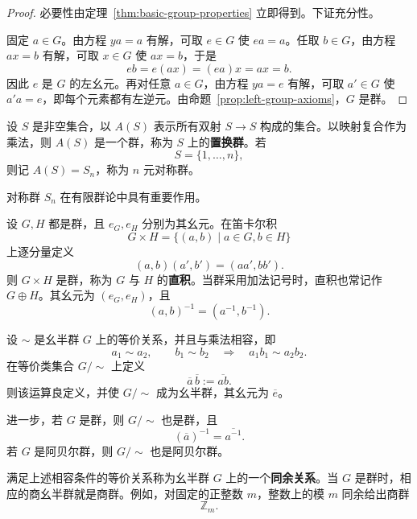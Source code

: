 \begin{proof}
必要性由定理~\ref{thm:basic-group-properties} 立即得到。下证充分性。

固定 $a\in G$。由方程 $ya=a$ 有解，可取 $e\in G$ 使 $ea=a$。任取 $b\in G$，由方程 $ax=b$ 有解，可取 $x\in G$ 使 $ax=b$，于是
\[
  eb=e(ax)=(ea)x=ax=b.
\]
因此 $e$ 是 $G$ 的左幺元。再对任意 $a\in G$，由方程 $ya=e$ 有解，可取 $a'\in G$ 使 $a'a=e$，即每个元素都有左逆元。由命题~\ref{prop:left-group-axioms}，$G$ 是群。
\end{proof}

\begin{example}[置换群]\label{ex:permutation-group}
设 $S$ 是非空集合，以 $A(S)$ 表示所有双射 $S\to S$ 构成的集合。以映射复合作为乘法，则 $A(S)$ 是一个群，称为 $S$ 上的\textbf{置换群}。若
\[
  S=\{1,\ldots,n\},
\]
则记 $A(S)=S_n$，称为 $n$ 元对称群。
\end{example}

\begin{purplenote}
对称群 $S_n$ 在有限群论中具有重要作用。
\end{purplenote}

\begin{definition}[群的直积]\label{def:group-direct-product}
设 $G,H$ 都是群，且 $e_G,e_H$ 分别为其幺元。在笛卡尔积
\[
  G\times H=\{(a,b)\mid a\in G, b\in H\}
\]
上逐分量定义
\[
  (a,b)(a',b')=(aa',bb').
\]
则 $G\times H$ 是群，称为 $G$ 与 $H$ 的\textbf{直积}。当群采用加法记号时，直积也常记作 $G\oplus H$。其幺元为 $(e_G,e_H)$，且
\[
  (a,b)^{-1}=(a^{-1},b^{-1}).
\]
\end{definition}

\begin{theorem}[商幺半群与商群的构造]\label{thm:quotient-congruence}
设 $\sim$ 是幺半群 $G$ 上的等价关系，并且与乘法相容，即
\[
  a_1\sim a_2,\qquad b_1\sim b_2
  \quad\Longrightarrow\quad
  a_1b_1\sim a_2b_2.
\]
在等价类集合 $G/{\sim}$ 上定义
\[
  \overline a\,\overline b:=\overline{ab}.
\]
则该运算良定义，并使 $G/{\sim}$ 成为幺半群，其幺元为 $\overline e$。

进一步，若 $G$ 是群，则 $G/{\sim}$ 也是群，且
\[
  (\overline a)^{-1}=\overline{a^{-1}}.
\]
若 $G$ 是阿贝尔群，则 $G/{\sim}$ 也是阿贝尔群。
\end{theorem}

\begin{purplenote}
满足上述相容条件的等价关系称为幺半群 $G$ 上的一个\textbf{同余关系}。当 $G$ 是群时，相应的商幺半群就是商群。例如，对固定的正整数 $m$，整数上的模 $m$ 同余给出商群
\[
  \mathbb Z_m.
\]
\end{purplenote}

